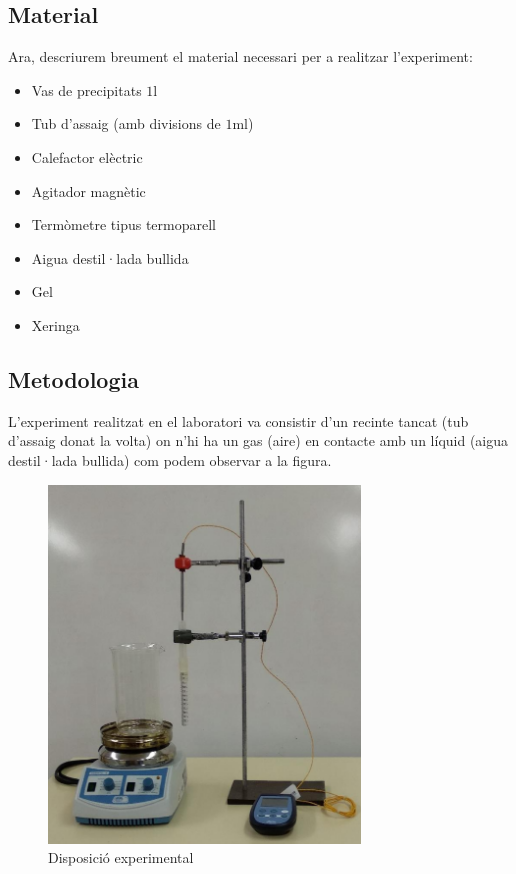 \documentclass{article}
\begin{document}
    \subsection{Material}
    Ara, descriurem breument el material necessari per a realitzar l'experiment:
    \begin{multicols}{2}
        \begin{itemize}
            \item Vas de precipitats $1\si{\litre}$
            \item Tub d'assaig (amb divisions de $1\si{\milli\litre}$)
            \item Calefactor elèctric
            \item Agitador magnètic
            \item Termòmetre tipus termoparell
            \item Aigua destil·lada bullida
            \item Gel
            \item Xeringa
        \end{itemize}
    \end{multicols}
    
    \vspace{10pt}
    \subsection{Metodologia}
    L’experiment realitzat en el laboratori va consistir d'un recinte tancat (tub d’assaig donat la volta) on n'hi ha un gas (aire) en contacte amb un líquid (aigua destil·lada bullida) com podem observar a la figura.
    
    \begin{figure}
        \centering
        \includegraphics[width=.45\textwidth,height=9.5cm]{fotos/setup.png}
        \caption{Disposició experimental}
        \label{fig:Disposició experimental}
    \end{figure}
\end{document}
